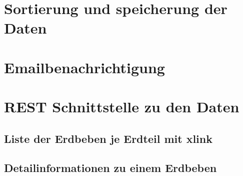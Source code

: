 \documentclass[11pt,english,ngerman, headsepline]{scrreprt}
\begin{document}
\chapter{Sortierung und speicherung der Daten}
\chapter{Emailbenachrichtigung}
\chapter{REST Schnittstelle zu den Daten}
\section{Liste der Erdbeben je Erdteil mit xlink}
\section{Detailinformationen zu einem Erdbeben}




 


\clearpage{}


\appendix
\renewcommand{\theequation}{A-\arabic{equation}}

\setcounter{equation}{0}  %




\listoffigures
\end{document}
